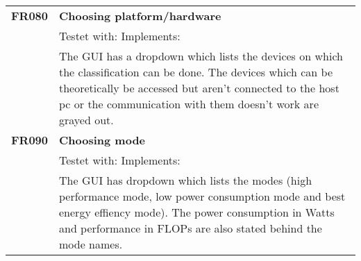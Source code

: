 \documentclass[parskip=full]{scrartcl}
\begin{document}
\begin{tabular}{p{2cm}p{12cm}}
\textbf{FR080} & \textbf{Choosing platform/hardware}\\
& Testet with: Implements: \\
& The GUI has a dropdown which lists the devices on which the classification can be done. The devices which can be theoretically be accessed but aren't connected to the host pc or the communication with them doesn't work are grayed out. \\
\textbf{FR090} & \textbf{Choosing mode}\\
& Testet with: Implements: \\
& The GUI has dropdown which lists the modes (high performance mode, low power consumption mode and best energy effiency mode). The power consumption in Watts and performance in FLOPs are also stated behind the mode names.
\end{tabular}
\end{document}
